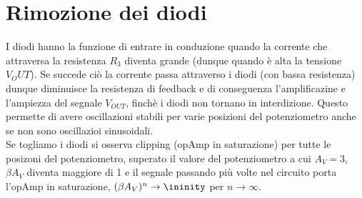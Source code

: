 \documentclass[10pt,a4paper]{article}
\begin{document}
\section{Rimozione dei diodi}
I diodi hanno la funzione di entrare in conduzione quando la corrente che attraversa la resistenza $R_3$ diventa grande (dunque quando è alta la tensione $V_OUT$). Se succede ciò la corrente passa attraverso i diodi (con bassa resistenza) dunque diminuisce la resistenza di feedback e di conseguenza l'amplificazine e l'ampiezza del segnale $V_{OUT}$, finchè i diodi non tornano in interdizione. Questo permette di avere oscillazioni stabili per varie posizioni del potenziometro anche se non sono oscillazioi sinusoidali.\\
Se togliamo i diodi si osserva clipping (opAmp in saturazione) per tutte le posizoni del potenziometro, superato il valore del potenziometro a cui $A_V = 3$, $\beta A_V$ diventa maggiore di 1 e il segnale passando più volte nel circuito porta l'opAmp in saturazione, $(\beta A_V)^n \rightarrow \ininity$ per $n \rightarrow \infty$.\\
\end{document}
